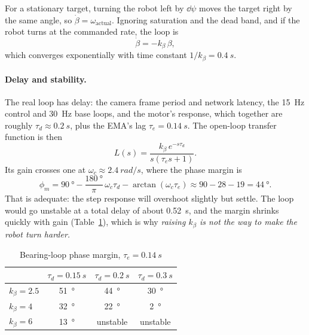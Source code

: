 For a stationary target, turning the robot left by $\dd\psi$ moves the
target right by the same angle, so $\dot\beta=\omega_{\mathrm{actual}}$.
Ignoring saturation and the dead band, and if the robot turns at the
commanded rate, the loop is
\begin{equation}
\dot\beta = -k_\beta\,\beta,
\end{equation}
which converges exponentially with time constant $1/k_\beta=\SI{0.4}{s}$.

\paragraph{Delay and stability.} The real loop has delay: the camera frame
period and network latency, the \SI{15}{Hz} control and \SI{30}{Hz} base
loops, and the motor's response, which together are roughly
$\tau_d\approx\SI{0.2}{s}$, plus the EMA's lag $\tau_e=\SI{0.14}{s}$. The
open-loop transfer function is then
\begin{equation}
L(s)=\frac{k_\beta\,e^{-s\tau_d}}{s(\tau_e s+1)} .
\end{equation}
Its gain crosses one at $\omega_c\approx\SI{2.4}{rad/s}$, where the phase
margin is
\begin{equation}
\phi_m = \SI{90}{\degree}-\frac{\SI{180}{\degree}}{\pi}\,\omega_c\tau_d-\arctan(\omega_c\tau_e)
\approx 90-28-19=\SI{44}{\degree}.
\end{equation}
That is adequate: the step response will overshoot slightly but settle. The
loop would go unstable at a total delay of about \SI{0.52}{s}, and the
margin shrinks quickly with gain (Table~\ref{tab:chasepm}), which is why
\emph{raising $k_\beta$ is not the way to make the robot turn harder.}

\begin{table}[htbp]
\centering
\caption{Bearing-loop phase margin, $\tau_e=\SI{0.14}{s}$}
\label{tab:chasepm}
\small
\begin{tabular}{lccc}
\toprule
 & $\tau_d=\SI{0.15}{s}$ & $\tau_d=\SI{0.2}{s}$ & $\tau_d=\SI{0.3}{s}$ \\
\midrule
$k_\beta=2.5$ & \SI{51}{\degree} & \SI{44}{\degree} & \SI{30}{\degree} \\
$k_\beta=4$ & \SI{32}{\degree} & \SI{22}{\degree} & \SI{2}{\degree} \\
$k_\beta=6$ & \SI{13}{\degree} & unstable & unstable \\
\bottomrule
\end{tabular}
\end{table}

